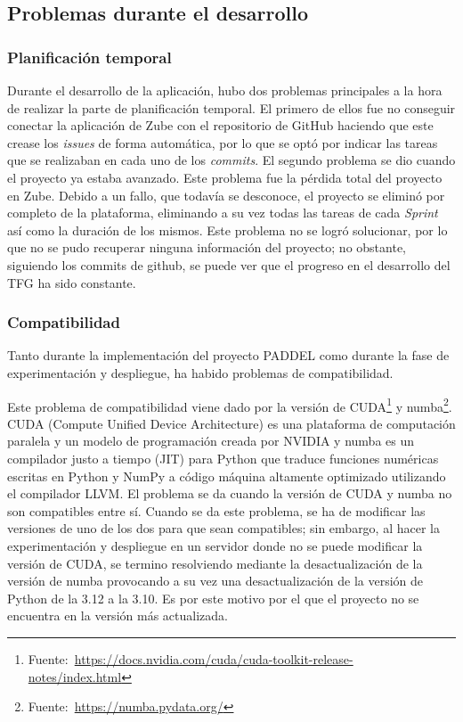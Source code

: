 \subsection{Problemas durante el desarrollo}

\subsubsection{Planificación temporal}

Durante el desarrollo de la aplicación, hubo dos problemas principales a la hora de realizar la parte de planificación temporal. El primero de ellos fue no conseguir conectar la aplicación de Zube con el repositorio de GitHub haciendo que este crease los \textit{issues} de forma automática, por lo que se optó por indicar las tareas que se realizaban en cada uno de los \textit{commits}. El segundo problema se dio cuando el proyecto ya estaba avanzado. Este problema fue la pérdida total del proyecto en Zube. Debido a un fallo, que todavía se desconoce, el proyecto se eliminó por completo de la plataforma, eliminando a su vez todas las tareas de cada \textit{Sprint} así como la duración de los mismos. Este problema no se logró solucionar, por lo que no se pudo recuperar ninguna información del proyecto; no obstante, siguiendo los commits de github, se puede ver que el progreso en el desarrollo del TFG ha sido constante.

\subsubsection{Compatibilidad}

Tanto durante la implementación del proyecto PADDEL como durante la fase de experimentación y despliegue, ha habido problemas de compatibilidad.

Este problema de compatibilidad viene dado por la versión de CUDA\footnote{Fuente:~\url{https://docs.nvidia.com/cuda/cuda-toolkit-release-notes/index.html}} y numba\footnote{Fuente:~\url{https://numba.pydata.org/}}. CUDA (Compute Unified Device Architecture) es una plataforma de computación paralela y un modelo de programación creada por NVIDIA y numba es un compilador justo a tiempo (JIT) para Python que traduce funciones numéricas escritas en Python y NumPy a código máquina altamente optimizado utilizando el compilador LLVM. El problema se da cuando la versión de CUDA y numba no son compatibles entre sí. Cuando se da este problema, se ha de modificar las versiones de uno de los dos para que sean compatibles; sin embargo, al hacer la experimentación y despliegue en un servidor donde no se puede modificar la versión de CUDA, se termino resolviendo mediante la desactualización de la versión de numba provocando a su vez una desactualización de la versión de Python de la 3.12 a la 3.10. Es por este motivo por el que el proyecto no se encuentra en la versión más actualizada.

